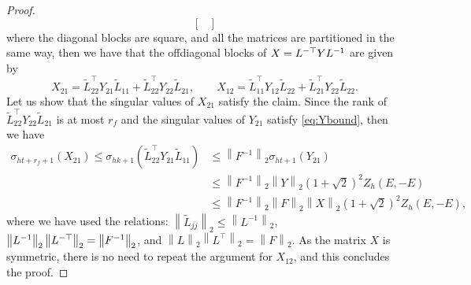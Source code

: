 \documentclass[10pt,a4paper]{amsart}
\newcommand{\norm}[1]{\left\lVert#1\right\rVert}
\newcommand{\upd}[1]{{\color{black}#1}} %
\begin{document}
\begin{proof}
$$\begin{bmatrix}
	\end{bmatrix}
	$$
	where the diagonal blocks are square, and all the matrices are partitioned in the same way, then we have that the offdiagonal blocks of $X=L^{-\upd{\top}}YL^{-1}$ are given by 
	$$
	X_{21}= \widetilde L_{22}^\top Y_{21}\widetilde L_{11} +\widetilde L_{22}^\top Y_{22}\widetilde L_{21}, \qquad  X_{12}= \widetilde L_{11}^\top Y_{12}\widetilde L_{22} +\widetilde L_{21}^\top Y_{22}\widetilde L_{22}.
	$$
	Let us show that the singular values of $X_{21}$ satisfy the claim. Since the rank of $\widetilde L_{22}^\top Y_{22}\widetilde L_{21}$ is at most $r_f$ and the singular values of $Y_{21}$ satisfy \eqref{eq:Ybound}, then we have
	\begin{align*}
		\sigma_{ht+r_f+1}(X_{21})\le \sigma_{hk+1}(\widetilde L_{22}^\top Y_{21}\widetilde L_{11})&\le \norm{F^{-1}}_2 \sigma_{ht+1}(Y_{21})\\ &\le \norm{F^{-1}}_2\norm{Y}_2 (1+\sqrt{2})^2 Z_h(E,-E)
		\\ & \le \norm{F^{-1}}_2 \norm{F}_2\norm{X}_2 (1+\sqrt{2})^2
		Z_h(E,-E),
	\end{align*}
	where we have used the relations: $\norm{\widetilde L_{jj}}_2\le \norm{L^{-1}}_2$, $\norm{L^{-1}}_2\norm{L^{-\upd{\top}}}_2= \norm{F^{-1}}_2$, and $\norm{L}_2\norm{L^\top}_2= \norm{F}_2$.
	As the matrix $X$ is symmetric, there is no need to repeat the argument for $X_{12}$,  and this concludes the proof. 
\end{proof}
\end{document}
